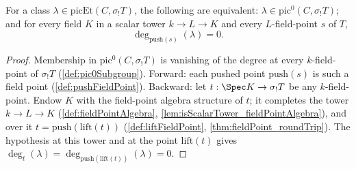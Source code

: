 \begin{theorem}
  \label{thm:mem_pic0Subgroup_iff_forall_pushFieldPoint}
  \leanok
  For a class \(\lambda \in \mathrm{picEt}(C, \sigma_{!}T)\), the following are
  equivalent: \(\lambda \in \mathrm{pic}^0(C, \sigma_{!}T)\); and for every field
  \(K\) in a scalar tower \(k \to L \to K\) and every \(L\)-field-point \(s\) of
  \(T\),
  \[
    \deg_{\mathrm{push}(s)}(\lambda) = 0 .
  \]
\end{theorem}
\begin{proof}
  \leanok
  Membership in \(\mathrm{pic}^0(C, \sigma_{!}T)\) is vanishing of the degree at every
  \(k\)-field-point of \(\sigma_{!}T\) (\ref{def:pic0Subgroup}). Forward: each pushed
  point \(\mathrm{push}(s)\) is such a field point (\ref{def:pushFieldPoint}).
  Backward: let \(t : \Spec K \to \sigma_{!}T\) be any \(k\)-field-point. Endow \(K\)
  with the field-point algebra structure of \(t\); it completes the tower
  \(k \to L \to K\) (\ref{def:fieldPointAlgebra},
  \ref{lem:isScalarTower_fieldPointAlgebra}), and over it
  \(t = \mathrm{push}(\mathrm{lift}(t))\) (\ref{def:liftFieldPoint},
  \ref{thm:fieldPoint_roundTrip}). The hypothesis at this tower and at the point
  \(\mathrm{lift}(t)\) gives
  \(\deg_t(\lambda) = \deg_{\mathrm{push}(\mathrm{lift}(t))}(\lambda) = 0\).
\end{proof}

